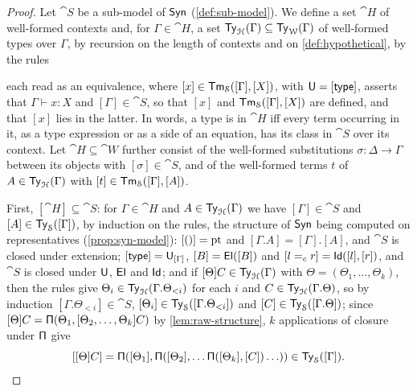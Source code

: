 \begin{proof}
    Let $\cat{S}$ be a sub-model of $\mathsf{Syn}$ (\cref{def:sub-model}). We define a set $\cat{H}$ of well-formed contexts and, for $\Gamma \in \cat{H}$, a set $\mathsf{Ty}_{\mathcal{H}}(\Gamma) \subseteq \mathsf{Ty}_{\mathcal{W}}(\Gamma)$ of well-formed types over $\Gamma$, by recursion on the length of contexts and on \cref{def:hypothetical}, by the rules
    each read as an equivalence, where $[x] \in \mathsf{Tm}_{\mathcal{S}}([\Gamma], [X])$, with $\mathsf{U} = [\mathsf{type}]$, asserts that $\Gamma \vdash x : X$ and $[\Gamma] \in \cat{S}$, so that $[x]$ and $\mathsf{Tm}_{\mathcal{S}}([\Gamma], [X])$ are defined, and that $[x]$ lies in the latter. In words, a type is in $\cat{H}$ iff every term occurring in it, as a type expression or as a side of an equation, has its class in $\cat{S}$ over its context. Let $\cat{H} \subseteq \cat{W}$ further consist of the well-formed substitutions $\sigma : \Delta \to \Gamma$ between its objects with $[\sigma] \in \cat{S}$, and of the well-formed terms $t$ of $A \in \mathsf{Ty}_{\mathcal{H}}(\Gamma)$ with $[t] \in \mathsf{Tm}_{\mathcal{S}}([\Gamma], [A])$.

    First, $[\cat{H}] \subseteq \cat{S}$: for $\Gamma \in \cat{H}$ and $A \in \mathsf{Ty}_{\mathcal{H}}(\Gamma)$ we have $[\Gamma] \in \cat{S}$ and $[A] \in \mathsf{Ty}_{\mathcal{S}}([\Gamma])$, by induction on the rules, the structure of $\mathsf{Syn}$ being computed on representatives (\cref{prop:syn-model}): $[()] = \mathrm{pt}$ and $[\Gamma.A] = [\Gamma].[A]$, and $\cat{S}$ is closed under extension; $[\mathsf{type}] = \mathsf{U}_{[\Gamma]}$, $[B] = \mathsf{El}([B])$ and $[l =_c r] = \mathsf{Id}([l], [r])$, and $\cat{S}$ is closed under $\mathsf{U}$, $\mathsf{El}$ and $\mathsf{Id}$; and if $[\Theta]C \in \mathsf{Ty}_{\mathcal{H}}(\Gamma)$ with $\Theta = (\Theta_1, \ldots, \Theta_k)$, then the rules give $\Theta_i \in \mathsf{Ty}_{\mathcal{H}}(\Gamma.\Theta_{<i})$ for each $i$ and $C \in \mathsf{Ty}_{\mathcal{H}}(\Gamma.\Theta)$, so by induction $[\Gamma.\Theta_{<i}] \in \cat{S}$, $[\Theta_i] \in \mathsf{Ty}_{\mathcal{S}}([\Gamma.\Theta_{<i}])$ and $[C] \in \mathsf{Ty}_{\mathcal{S}}([\Gamma.\Theta])$; since $[\Theta]C = \mathsf{\Pi}(\Theta_1, [\Theta_2, \ldots, \Theta_k]C)$ by \cref{lem:raw-structure}, $k$ applications of closure under $\mathsf{\Pi}$ give
    \[
        [[\Theta]C] = \mathsf{\Pi}([\Theta_1], \mathsf{\Pi}([\Theta_2], \ldots \mathsf{\Pi}([\Theta_k], [C]) \ldots)) \in \mathsf{Ty}_{\mathcal{S}}([\Gamma]).
    \]


\end{proof}
